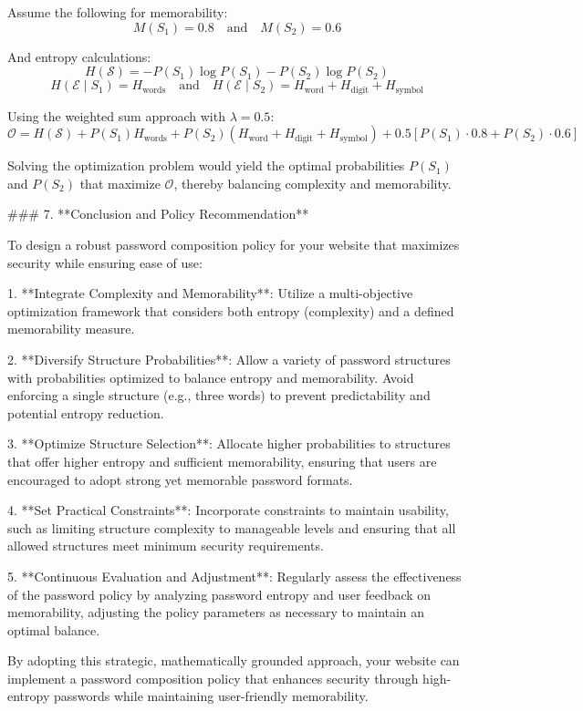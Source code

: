 Assume the following for memorability:
\[
M(S_1) = 0.8 \quad \text{and} \quad M(S_2) = 0.6
\]

And entropy calculations:
\[
H(\mathcal{S}) = - P(S_1) \log P(S_1) - P(S_2) \log P(S_2)
\]
\[
H(\mathcal{E} \mid S_1) = H_{\text{words}} \quad \text{and} \quad H(\mathcal{E} \mid S_2) = H_{\text{word}} + H_{\text{digit}} + H_{\text{symbol}}
\]

Using the weighted sum approach with \( \lambda = 0.5 \):
\[
\mathcal{O} = H(\mathcal{S}) + P(S_1) H_{\text{words}} + P(S_2) (H_{\text{word}} + H_{\text{digit}} + H_{\text{symbol}}) + 0.5 [P(S_1) \cdot 0.8 + P(S_2) \cdot 0.6]
\]

Solving the optimization problem would yield the optimal probabilities \( P(S_1) \) and \( P(S_2) \) that maximize \( \mathcal{O} \), thereby balancing complexity and memorability.

### 7. **Conclusion and Policy Recommendation**

To design a robust password composition policy for your website that maximizes security while ensuring ease of use:

1. **Integrate Complexity and Memorability**: Utilize a multi-objective optimization framework that considers both entropy (complexity) and a defined memorability measure.

2. **Diversify Structure Probabilities**: Allow a variety of password structures with probabilities optimized to balance entropy and memorability. Avoid enforcing a single structure (e.g., three words) to prevent predictability and potential entropy reduction.

3. **Optimize Structure Selection**: Allocate higher probabilities to structures that offer higher entropy and sufficient memorability, ensuring that users are encouraged to adopt strong yet memorable password formats.

4. **Set Practical Constraints**: Incorporate constraints to maintain usability, such as limiting structure complexity to manageable levels and ensuring that all allowed structures meet minimum security requirements.

5. **Continuous Evaluation and Adjustment**: Regularly assess the effectiveness of the password policy by analyzing password entropy and user feedback on memorability, adjusting the policy parameters as necessary to maintain an optimal balance.

By adopting this strategic, mathematically grounded approach, your website can implement a password composition policy that enhances security through high-entropy passwords while maintaining user-friendly memorability.